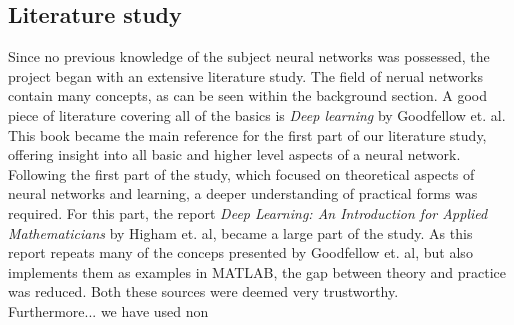\documentclass{article}
\begin{document}
\subsection{Literature study}
Since no previous knowledge of the subject neural networks was possessed, the project began with an extensive literature study. The field of nerual networks contain many concepts, as can be seen within the background section. A good piece of literature covering all of the basics is \textit{Deep learning} by Goodfellow et. al. This book became the main reference for the first part of our literature study, offering insight into all basic and higher level aspects of a neural network. Following the first part of the study, which focused on theoretical aspects of neural networks and learning, a deeper understanding of practical forms was required. For this part, the report \textit{Deep Learning: An Introduction for Applied Mathematicians} by Higham et. al, became a large part of the study. As this report repeats many of the conceps presented by Goodfellow et. al, but also implements them as examples in MATLAB, the gap between theory and practice was reduced. Both these sources were deemed very trustworthy.\\

\noindent Furthermore... we have used non 
\end{document}

